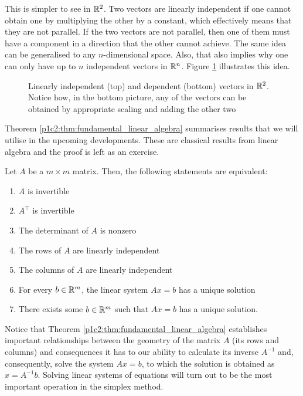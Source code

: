 This is simpler to see in $\mathbb{R}^2$. Two vectors are linearly independent if one cannot obtain one by multiplying the other by a constant, which effectively means that they are not parallel. If the two vectors are not parallel, then one of them must have a component in a direction that the other cannot achieve. The same idea can be generalised to any $n$-dimensional space. Also, that also implies why one can only have up to $n$ independent vectors in $\mathbb{R}^n$. Figure \ref{p1c2:fig:linear_independence} illustrates this idea. 

\begin{figure}[h]
	\centering
	\caption{Linearly independent (top) and dependent (bottom) vectors in $\mathbb{R}^2$. Notice how, in the bottom picture, any of the vectors can be obtained by appropriate scaling and adding the other two}\label{p1c2:fig:linear_independence}
\end{figure}

Theorem \ref{p1c2:thm:fundamental_linear_algebra} summarises results that we will utilise in the upcoming developments. These are classical results from linear algebra and the proof is left as an exercise.
%
\begin{theorem}[Inverses, linear independence, and solving $Ax = b$] \label{p1c2:thm:fundamental_linear_algebra}
	Let $A$ be a $m \times m$ matrix. Then, the following statements are equivalent:
	\begin{enumerate}
		\item $A$ is invertible
		\item $A^\top$ is invertible
		\item The determinant of $A$ is nonzero
		\item The rows of $A$ are linearly independent
		\item The columns of $A$ are linearly independent
		\item For every $b \in \mathbb{R}^m$, the linear system $Ax = b$ has a unique solution
		\item There exists some $b \in \mathbb{R}^m$ such that $Ax = b$ has a unique solution.	
	\end{enumerate}	
\end{theorem}
%
Notice that Theorem \ref{p1c2:thm:fundamental_linear_algebra} establishes important relationships between the geometry of the matrix $A$ (its rows and columns) and consequences it has to our ability to calculate its inverse $A^{-1}$ and, consequently, solve the system $Ax = b$, to which the solution is obtained as $x = A^{-1}b$. Solving linear systems of equations will turn out to be the most important operation in the simplex method.


